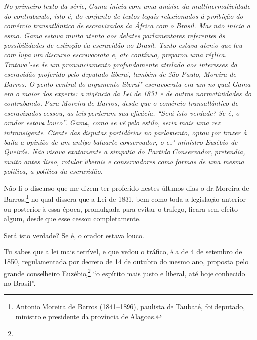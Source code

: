 \begin{flushleft}
{\footnotesize\itshape
No primeiro texto da série, Gama inicia com uma
análise da multinormatividade do contrabando, isto é, do conjunto de
textos legais relacionados à proibição do comércio transatlântico de
escravizados da África com o Brasil. Mas não inicia a esmo. Gama estava
muito atento aos debates parlamentares referentes às possibilidades de
extinção da escravidão no Brasil. Tanto estava atento que leu com lupa
um discurso escravocrata e, ato contínuo, preparou uma réplica.
Tratava"-se de um pronunciamento profundamente atrelado aos interesses da
escravidão proferido pelo deputado liberal, também de São Paulo, Moreira
de Barros. O ponto central do argumento liberal"-escravocrata era um no
qual Gama era o maior dos experts: a vigência da Lei de 1831 e de outras
normatividades do contrabando. Para Moreira de Barros, desde que o
comércio transatlântico de escravizados cessou, as leis perderam sua
eficácia. ``Será isto verdade? Se é, o orador estava louco''. Gama, como
se vê pelo estilo, seria mais uma vez intransigente. Ciente das disputas
partidárias no parlamento, optou por trazer à baila a opinião de um
antigo baluarte conservador, o ex"-ministro Eusébio de Queirós. Não
visava exatamente a simpatia do Partido Conservador, pretendia, muito
antes disso, rotular liberais e conservadores como formas de uma mesma
política, a política da escravidão. }
\end{flushleft}

\noindent{}Não li o discurso que me dizem ter proferido nestes últimos dias o dr.\,Moreira de Barros,\footnote{Antonio Moreira de Barros (1841--1896),
  paulista de Taubaté, foi deputado, ministro e presidente da província
  de Alagoas.} no qual dissera que a Lei de 1831, bem como toda a
legislação anterior ou posterior à essa época, promulgada para evitar o
tráfego, ficara sem efeito algum, desde que esse cessou completamente.

Será isto verdade? Se é, o orador estava louco.

Tu sabes que a lei mais terrível, e que vedou o tráfico, é a de 4 de
setembro de 1850, regulamentada por decreto de 14 de outubro do mesmo
ano, proposta pelo grande conselheiro Euzébio,\footnote{} ``o espírito
mais justo e liberal, até hoje conhecido no Brasil''.

